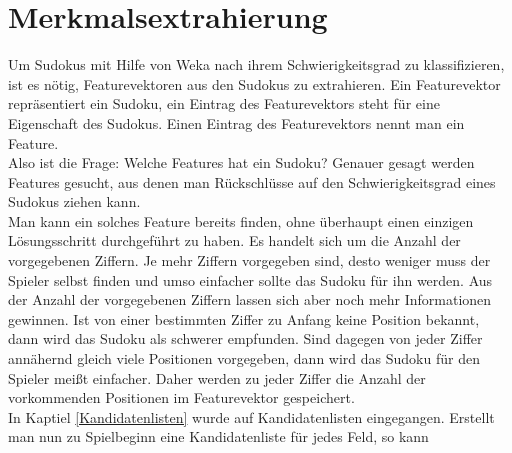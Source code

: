 \chapter{Merkmalsextrahierung}
Um Sudokus mit Hilfe von Weka nach ihrem Schwierigkeitsgrad zu klassifizieren, ist es nötig, Featurevektoren aus den Sudokus zu extrahieren. Ein Featurevektor repräsentiert ein Sudoku, ein Eintrag des Featurevektors steht für eine Eigenschaft des Sudokus. Einen Eintrag des Featurevektors nennt man ein Feature.\\
Also ist die Frage: Welche Features hat ein Sudoku? Genauer gesagt werden Features gesucht, aus denen man Rückschlüsse auf den Schwierigkeitsgrad eines Sudokus ziehen kann.\\
Man kann ein solches Feature bereits finden, ohne überhaupt einen einzigen Lösungsschritt durchgeführt zu haben. Es handelt sich um die Anzahl der vorgegebenen Ziffern. Je mehr Ziffern vorgegeben sind, desto weniger muss der Spieler selbst finden und umso einfacher sollte das Sudoku für ihn werden. Aus der Anzahl der vorgegebenen Ziffern lassen sich aber noch mehr Informationen gewinnen. Ist von einer bestimmten Ziffer zu Anfang keine Position bekannt, dann wird das Sudoku als schwerer empfunden. Sind dagegen von jeder Ziffer annähernd gleich viele Positionen vorgegeben, dann wird das Sudoku für den Spieler meißt einfacher. Daher werden zu jeder Ziffer die Anzahl der vorkommenden Positionen im Featurevektor gespeichert.\\
In Kaptiel \ref{Kandidatenlisten} wurde auf Kandidatenlisten eingegangen. Erstellt man nun zu Spielbeginn eine Kandidatenliste für jedes Feld, so kann 